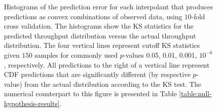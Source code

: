 \begin{figure}
  \centering
  \caption{Histograms of the prediction error for each interpolant
    that produces predictions as convex combinations of observed data,
    using $10$-fold cross validation. The histograms show the KS
    statistics for the predicted throughput distribution versus the
    actual throughput distribution. The four vertical lines represent
    cutoff KS statistics given $150$ samples for commonly used
    $p$-values 0.05, 0.01, 0.001, $10^{-6}$, respectively. All
    predictions to the right of a vertical line represent CDF
    predictions that are significantly different (by respective
    $p$-value) from the actual distribution according to the KS
    test. The numerical counterpart to this figure is presented in
    Table \ref{table:null-hypothesis-results}.}
  \label{fig:throughput-prediction}
\end{figure}

